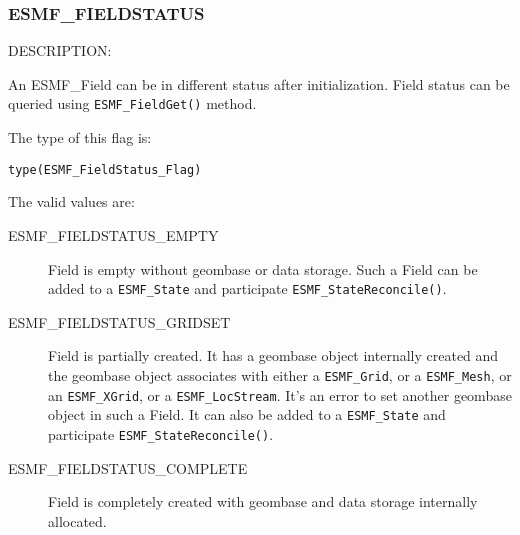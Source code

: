 
\subsubsection{ESMF\_FIELDSTATUS}
\label{const:fieldstatus}

{\sf DESCRIPTION:\\}  
\begin{sloppypar}
An {ESMF\_Field} can be in different status after initialization. Field status can be queried using {\tt ESMF\_FieldGet()} method.
\end{sloppypar}

The type of this flag is:

{\tt type(ESMF\_FieldStatus\_Flag)}

The valid values are:
\begin{description}
\item [ESMF\_FIELDSTATUS\_EMPTY]
      Field is empty without geombase or data storage. Such a Field can be added to a {\tt ESMF\_State} and participate {\tt ESMF\_StateReconcile()}. 
\item [ESMF\_FIELDSTATUS\_GRIDSET]
      Field is partially created. It has a geombase object internally created and the geombase object associates with either a {\tt ESMF\_Grid}, or a {\tt ESMF\_Mesh}, or an {\tt ESMF\_XGrid}, or a {\tt ESMF\_LocStream}. It's an error to set another geombase object in such a Field. It can also be added to a {\tt ESMF\_State} and participate {\tt ESMF\_StateReconcile()}.
\item [ESMF\_FIELDSTATUS\_COMPLETE]
      Field is completely created with geombase and data storage internally allocated. 
\end{description}
